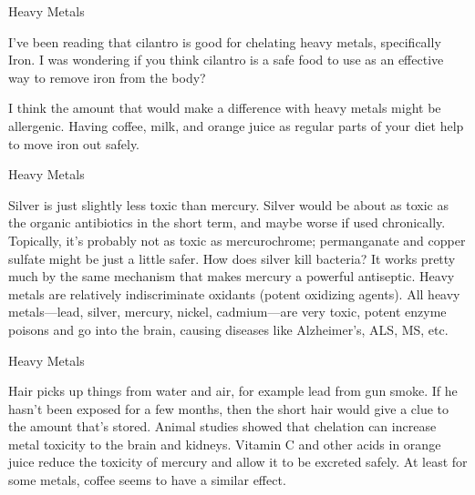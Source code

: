 \documentclass[11pt,oneside,openany,extrafontsizes]{memoir}
\begin{document}
\begin{qaexchange}{Heavy Metals}

    \begin{question}
        I've been reading that cilantro is good for chelating heavy metals, specifically Iron. I was wondering if you think cilantro is a safe food to use as an effective way to remove iron from the body?
    \end{question}

    \begin{answer}
       I think the amount that would make a difference with heavy metals might be allergenic. Having coffee, milk, and orange juice as regular parts of your diet help to move iron out safely.
    \end{answer}
\end{qaexchange}

\begin{standalonequote}{Heavy Metals}

    \begin{answer}
       Silver is just slightly less toxic than mercury. Silver would be about as toxic as the organic antibiotics in the short term, and maybe worse if used chronically. Topically, it's probably not as toxic as mercurochrome; permanganate and copper sulfate might be just a little safer. How does silver kill bacteria? It works pretty much by the same mechanism that makes mercury a powerful antiseptic. Heavy metals are relatively indiscriminate oxidants (potent oxidizing agents). All heavy metals---lead, silver, mercury, nickel, cadmium---are very toxic, potent enzyme poisons and go into the brain, causing diseases like Alzheimer's, ALS, MS, etc. 
    \end{answer}
\end{standalonequote}

\begin{standalonequote}{Heavy Metals}

    \begin{answer}
       Hair picks up things from water and air, for example lead from gun smoke. If he hasn't been exposed for a few months, then the short hair would give a clue to the amount that's stored. Animal studies showed that chelation can increase metal toxicity to the brain and kidneys. Vitamin C and other acids in orange juice reduce the toxicity of mercury and allow it to be excreted safely. At least for some metals, coffee seems to have a similar effect.
    \end{answer}
\end{standalonequote}
\end{document}
